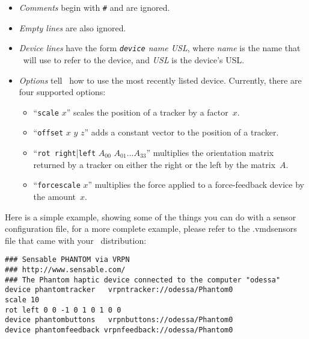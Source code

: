 \begin{itemize}
  \item {\it Comments\/} begin with {\tt \#} and are ignored.
  \item {\it Empty lines\/} are also ignored.
  \item {\it Device lines\/} have the form {\it {\tt device} name
    USL}, where {\it name\/} is the name that \VMD\ will use to refer
    to the device, and {\it USL\/} is the device's USL.
  \item {\it Options\/} tell \VMD\ how to use the most recently listed
    device.  Currently, there are four supported options:
\begin{itemize}
  \item ``{\tt scale} $x$'' scales the position of a tracker by a
    factor~$x$.
  \item ``{\tt offset} $x$ $y$ $z$'' adds a constant vector to the
    position of a tracker.
  \item ``{\tt rot right}|{\tt left} $A_{00}$ $A_{01}\ldots A_{33}$''
    multiplies the orientation matrix returned by a tracker on either
    the right or the left by the matrix~$A$.
  \item ``{\tt forcescale} $x$'' multiplies the force applied to a
    force-feedback device by the amount~$x$.
\end{itemize}
\end{itemize}

Here is a simple example, showing some of the things you can do with a
sensor configuration file, for a more complete example, please refer
to the .vmdsensors file that came with your \VMD\ distribution:
\begin{verbatim}
### Sensable PHANTOM via VRPN 
### http://www.sensable.com/
### The Phantom haptic device connected to the computer "odessa"
device phantomtracker   vrpntracker://odessa/Phantom0
scale 10
rot left 0 0 -1 0 1 0 1 0 0
device phantombuttons   vrpnbuttons://odessa/Phantom0
device phantomfeedback vrpnfeedback://odessa/Phantom0
\end{verbatim}

